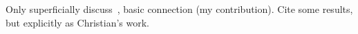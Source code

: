 Only superficially discuss~\cite{menard_date20}, basic connection (my contribution). Cite some results, but explicitly as Christian's work.